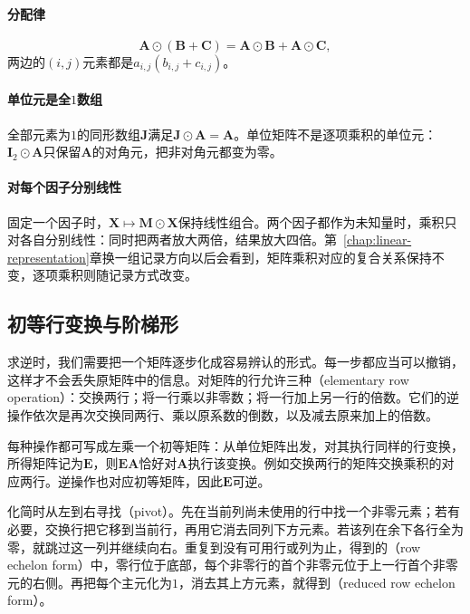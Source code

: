 \paragraph{分配律}
\[
 \bm A\odot(\bm B+\bm C)=\bm A\odot\bm B+\bm A\odot\bm C,
\]
两边的$(i,j)$元素都是$a_{i,j}(b_{i,j}+c_{i,j})$。

\paragraph{单位元是全$1$数组}
全部元素为$1$的同形数组$\bm J$满足$\bm J\odot\bm A=\bm A$。单位矩阵不是逐项乘积的单位元：$\bm I_2\odot\bm A$只保留$\bm A$的对角元，把非对角元都变为零。

\paragraph{对每个因子分别线性}
固定一个因子时，$\bm X\mapsto\bm M\odot\bm X$保持线性组合。两个因子都作为未知量时，乘积只对各自分别线性：同时把两者放大两倍，结果放大四倍。第~\ref{chap:linear-representation}章换一组记录方向以后会看到，矩阵乘积对应的复合关系保持不变，逐项乘积则随记录方式改变。


\subsection{初等行变换与阶梯形}
\label{sec:ls-elementary-row-operations}

求逆时，我们需要把一个矩阵逐步化成容易辨认的形式。每一步都应当可以撤销，这样才不会丢失原矩阵中的信息。对矩阵的行允许三种（elementary row operation）：交换两行；将一行乘以非零数；将一行加上另一行的倍数。它们的逆操作依次是再次交换同两行、乘以原系数的倒数，以及减去原来加上的倍数。

每种操作都可写成左乘一个初等矩阵：从单位矩阵出发，对其执行同样的行变换，所得矩阵记为$\bm E$，则$\bm E\bm A$恰好对$\bm A$执行该变换。例如交换两行的矩阵交换乘积的对应两行。逆操作也对应初等矩阵，因此$\bm E$可逆。

化简时从左到右寻找（pivot）。先在当前列尚未使用的行中找一个非零元素；若有必要，交换行把它移到当前行，再用它消去同列下方元素。若该列在余下各行全为零，就跳过这一列并继续向右。重复到没有可用行或列为止，得到的（row echelon form）中，零行位于底部，每个非零行的首个非零元位于上一行首个非零元的右侧。再把每个主元化为$1$，消去其上方元素，就得到（reduced row echelon form）。

